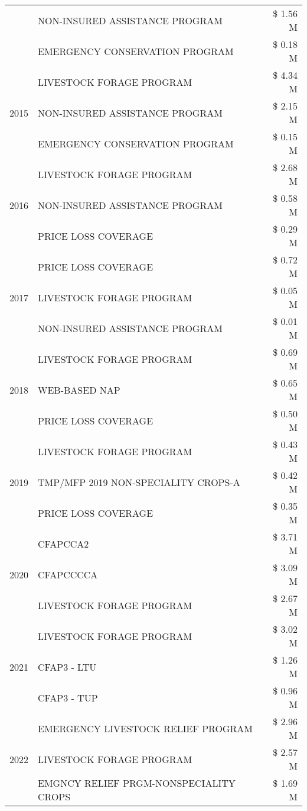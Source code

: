 \begin{tabular}{llr}
 & NON-INSURED ASSISTANCE PROGRAM & \$ 1.56 M \\
 & EMERGENCY CONSERVATION PROGRAM & \$ 0.18 M \\
\cline{1-3}
\multirow[t]{3}{*}{2015} & LIVESTOCK FORAGE PROGRAM & \$ 4.34 M \\
 & NON-INSURED ASSISTANCE PROGRAM & \$ 2.15 M \\
 & EMERGENCY CONSERVATION PROGRAM & \$ 0.15 M \\
\cline{1-3}
\multirow[t]{3}{*}{2016} & LIVESTOCK FORAGE PROGRAM & \$ 2.68 M \\
 & NON-INSURED ASSISTANCE PROGRAM & \$ 0.58 M \\
 & PRICE LOSS COVERAGE & \$ 0.29 M \\
\cline{1-3}
\multirow[t]{3}{*}{2017} & PRICE LOSS COVERAGE & \$ 0.72 M \\
 & LIVESTOCK FORAGE PROGRAM & \$ 0.05 M \\
 & NON-INSURED ASSISTANCE PROGRAM & \$ 0.01 M \\
\cline{1-3}
\multirow[t]{3}{*}{2018} & LIVESTOCK FORAGE PROGRAM & \$ 0.69 M \\
 & WEB-BASED NAP & \$ 0.65 M \\
 & PRICE LOSS COVERAGE & \$ 0.50 M \\
\cline{1-3}
\multirow[t]{3}{*}{2019} & LIVESTOCK FORAGE PROGRAM & \$ 0.43 M \\
 & TMP/MFP 2019 NON-SPECIALITY CROPS-A & \$ 0.42 M \\
 & PRICE LOSS COVERAGE & \$ 0.35 M \\
\cline{1-3}
\multirow[t]{3}{*}{2020} & CFAPCCA2 & \$ 3.71 M \\
 & CFAPCCCCA & \$ 3.09 M \\
 & LIVESTOCK FORAGE PROGRAM & \$ 2.67 M \\
\cline{1-3}
\multirow[t]{3}{*}{2021} & LIVESTOCK FORAGE PROGRAM & \$ 3.02 M \\
 & CFAP3 - LTU & \$ 1.26 M \\
 & CFAP3 - TUP & \$ 0.96 M \\
\cline{1-3}
\multirow[t]{3}{*}{2022} & EMERGENCY LIVESTOCK RELIEF PROGRAM & \$ 2.96 M \\
 & LIVESTOCK FORAGE PROGRAM & \$ 2.57 M \\
 & EMGNCY RELIEF PRGM-NONSPECIALITY CROPS & \$ 1.69 M \\
\cline{1-3}
\bottomrule
\end{tabular}
